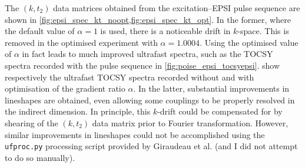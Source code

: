 The $(k, t_2)$ data matrices obtained from the excitation--EPSI pulse sequence are shown in \cref{fig:epsi_spec_kt_noopt,fig:epsi_spec_kt_opt}.
In the former, where the default value of $\alpha = 1$ is used, there is a noticeable drift in $k$-space.
This is removed in the optimised experiment with $\alpha = 1.0004$.
Using the optimised value of $\alpha$ in fact leads to much improved ultrafast spectra, such as the TOCSY spectra recorded with the pulse sequence in \cref{fig:poise_epsi_tocsyepsi}.
 show respectively the ultrafast TOCSY spectra recorded without and with optimisation of the gradient ratio $\alpha$.
In the latter, substantial improvements in lineshapes are obtained, even allowing some couplings to be properly resolved in the indirect dimension.
In principle, this $k$-drift could be compensated for by shearing of the $(k, t_2)$ data matrix prior to Fourier transformation.
However, similar improvements in lineshapes could not be accomplished using the \texttt{ufproc.py} processing script provided by Giraudeau et al.\autocite{Gouilleux2018ARNMRS} (and I did not attempt to do so manually).
